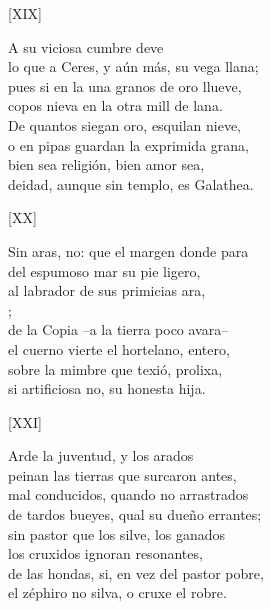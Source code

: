 \documentclass[11pt,a4paper,twoside]{article}
\begin{document}
\begin{center}
	[XIX]
\end{center}\pstart
A  su viciosa cumbre deve\\
lo que a Ceres, y aún más, su vega llana;\\
pues si en la una granos de oro llueve,\\
copos nieva en la otra mill de lana.\\
De quantos siegan oro, esquilan nieve,\\
o en pipas guardan la exprimida grana,\\
bien sea religión, bien amor sea,\\
deidad, aunque sin templo, es Galathea.\par\pend
%
\begin{center}
	[XX]
\end{center}\pstart
Sin aras, no: que el margen donde para\\
del espumoso mar su pie ligero,\\
al labrador de sus primicias ara,\\
;\\
de la Copia --a la tierra poco avara--\\
el cuerno vierte el hortelano, entero,\\
sobre la mimbre que texió, prolixa,\\
si artificiosa no, su honesta hija.\par\pend
%
\begin{center}
	[XXI]
\end{center}\pstart
Arde la juventud, y los arados\\
peinan las tierras que surcaron antes,\\
mal conducidos, quando no arrastrados\\
de tardos bueyes, qual su dueño errantes;\\
sin pastor que los silve, los ganados\\
los cruxidos ignoran resonantes,\\
de las hondas, si, en vez del pastor pobre,\\
el zéphiro no silva, o cruxe el robre.\par\pend
\end{document}
